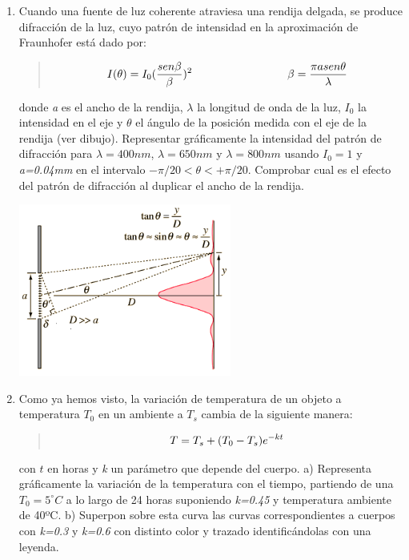 \documentclass[letterpaper,10pt,spanish]{sphinxmanual}
\begin{document}
\begin{enumerate}
\item {} 
Cuando una fuente de luz coherente atraviesa una rendija delgada, se produce difracción de la luz, cuyo patrón de intensidad en la aproximación de Fraunhofer está dado por:
\begin{quote}
\begin{gather}
\begin{split}I(\theta) = I_0(\frac{sen \beta}{\beta})^2 \hspace{3cm}  \beta = \frac{\pi a sen \theta}{\lambda}\end{split}\notag
\end{gather}\end{quote}

donde \emph{a} es el ancho de la rendija, $\lambda$ la longitud de onda de la luz,  $I_0$ la intensidad en el eje y $\theta$ el ángulo de la posición medida con el eje de la rendija (ver dibujo). Representar gráficamente la intensidad del patrón de difracción para  $\lambda=400nm$,  $\lambda=650nm$ y $\lambda=800nm$ usando  $I_0=1$ y \emph{a=0.04mm} en el intervalo  $-\pi/20 < \theta < +\pi/20$. Comprobar cual es el efecto del patrón de difracción al duplicar el ancho de la rendija.

{\hfill\includegraphics[width=7cm]{fraungeo.png}\hfill}

\item {} 
Como ya hemos visto, la variación de temperatura de un objeto a temperatura $T_0$ en un ambiente a $T_s$ cambia de la siguiente manera:
\begin{quote}
\begin{gather}
\begin{split}T =  T_s + (T_0 - T_s)e^{-kt}\end{split}\notag
\end{gather}\end{quote}

con $t$ en horas y \emph{k} un parámetro que depende del cuerpo. a) Representa gráficamente la variación de la temperatura con el tiempo, partiendo de una $T_0=5^\circ C$ a lo largo de 24 horas suponiendo \emph{k=0.45} y temperatura ambiente de 40ºC. b) Superpon sobre esta curva las curvas correspondientes a cuerpos con \emph{k=0.3} y \emph{k=0.6} con distinto color y trazado identificándolas con una leyenda.


\end{enumerate}
\end{document}
